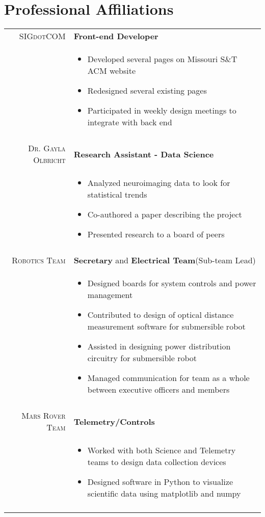 \documentclass[a4paper,10pt]{article}
\newcommand{\br}{\\\multicolumn{2}{c}{}}
\begin{document}
\section{Professional Affiliations}
\begin{tabular}{r|p{15cm}}
    \textsc{SIGdotCOM} & \textbf{Front-end Developer} \\
    & \begin{itemize}
    \item Developed several pages on Missouri S\&T ACM website
    \item Redesigned several existing pages
    \item Participated in weekly design meetings to integrate with back end
    \end{itemize} \br\\

    \textsc{Dr. Gayla Olbricht} & \textbf{Research Assistant - Data Science} \\
     & \begin{itemize}
    \item Analyzed neuroimaging data to look for statistical trends
    \item Co-authored a paper describing the project
    \item Presented research to a board of peers
    \end{itemize} \br\\

    \textsc{Robotics Team} & \textbf{Secretary} and \textbf{Electrical Team}(Sub-team Lead) \\
     & \begin{itemize}
     \item Designed boards for system controls and power management
     \item Contributed to design of optical distance measurement software for submersible robot
     \item Assisted in designing power distribution circuitry for submersible robot
     \item Managed communication for team as a whole between executive officers and members
    \end{itemize} \br\\

    \textsc{Mars Rover Team} & \textbf{Telemetry/Controls} \\
     & \begin{itemize}
     \item{Worked with both Science and Telemetry teams to design data collection devices}
     \item{Designed software in Python to visualize scientific data using matplotlib and numpy}
     \end{itemize} \br\\


\end{tabular}
\end{document}
